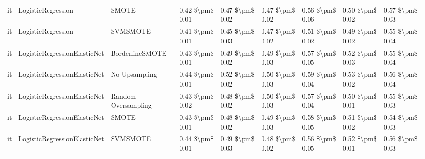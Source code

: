\begin{tabular}{lllllllll}
      it &              LogisticRegression &                         SMOTE & 0.42 \$\textbackslash pm\$ 0.01 &           0.47 \$\textbackslash pm\$ 0.02 &       0.47 \$\textbackslash pm\$ 0.02 &        0.56 \$\textbackslash pm\$ 0.06 &                         0.50 \$\textbackslash pm\$ 0.02 &     0.57 \$\textbackslash pm\$ 0.03 \\
      it &              LogisticRegression &                      SVMSMOTE & 0.41 \$\textbackslash pm\$ 0.01 &           0.45 \$\textbackslash pm\$ 0.03 &       0.47 \$\textbackslash pm\$ 0.02 &        0.51 \$\textbackslash pm\$ 0.02 &                         0.49 \$\textbackslash pm\$ 0.02 &     0.55 \$\textbackslash pm\$ 0.04 \\
      it &    LogisticRegressionElasticNet &               BorderlineSMOTE & 0.43 \$\textbackslash pm\$ 0.01 &           0.49 \$\textbackslash pm\$ 0.02 &       0.49 \$\textbackslash pm\$ 0.03 &        0.57 \$\textbackslash pm\$ 0.05 &                         0.52 \$\textbackslash pm\$ 0.03 &     0.55 \$\textbackslash pm\$ 0.04 \\
      it &    LogisticRegressionElasticNet &                 No Upsampling & 0.44 \$\textbackslash pm\$ 0.01 &           0.52 \$\textbackslash pm\$ 0.02 &       0.50 \$\textbackslash pm\$ 0.03 &        0.59 \$\textbackslash pm\$ 0.04 &                         0.53 \$\textbackslash pm\$ 0.02 &     0.56 \$\textbackslash pm\$ 0.04 \\
      it &    LogisticRegressionElasticNet &           Random Oversampling & 0.43 \$\textbackslash pm\$ 0.02 &           0.48 \$\textbackslash pm\$ 0.02 &       0.50 \$\textbackslash pm\$ 0.03 &        0.57 \$\textbackslash pm\$ 0.04 &                         0.50 \$\textbackslash pm\$ 0.01 &     0.55 \$\textbackslash pm\$ 0.03 \\
      it &    LogisticRegressionElasticNet &                         SMOTE & 0.43 \$\textbackslash pm\$ 0.01 &           0.48 \$\textbackslash pm\$ 0.02 &       0.49 \$\textbackslash pm\$ 0.03 &        0.58 \$\textbackslash pm\$ 0.05 &                         0.51 \$\textbackslash pm\$ 0.02 &     0.54 \$\textbackslash pm\$ 0.03 \\
      it &    LogisticRegressionElasticNet &                      SVMSMOTE & 0.44 \$\textbackslash pm\$ 0.01 &           0.49 \$\textbackslash pm\$ 0.03 &       0.48 \$\textbackslash pm\$ 0.02 &        0.56 \$\textbackslash pm\$ 0.05 &                         0.52 \$\textbackslash pm\$ 0.01 &     0.56 \$\textbackslash pm\$ 0.03 \\

\end{tabular}
